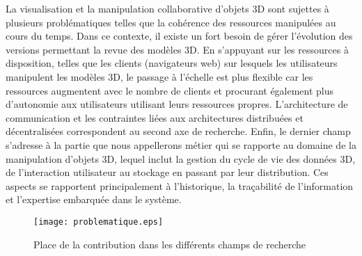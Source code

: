 La visualisation et la manipulation collaborative d'objets \gls{3D} sont sujettes à 
plusieurs problématiques telles que la cohérence des ressources manipulées au 
cours du temps. Dans ce contexte, il existe un fort besoin de gérer l'évolution des 
versions permettant la revue des modèles \gls{3D}. 
En s'appuyant sur les ressources à disposition, telles que les clients (navigateurs 
web) sur lesquels les utilisateurs manipulent les modèles \gls{3D}, le passage à 
l'échelle est plus flexible car les ressources augmentent avec le nombre de clients 
et procurant également plus d'autonomie aux utilisateurs utilisant leurs ressources 
propres.
L'architecture de communication et les contraintes liées aux architectures 
distribuées et décentralisées correspondent au second axe de recherche. 
Enfin, le dernier champ 
s'adresse à la partie que nous appellerons \og métier\fg{} qui se rapporte au 
domaine de la manipulation d'objets \gls{3D}, lequel inclut la 
gestion du cycle de vie des données \gls{3D}, de l'interaction utilisateur au 
stockage 
en passant par leur distribution. Ces aspects se rapportent principalement à 
l'historique, la traçabilité de l'information et l'expertise embarquée dans le système.

\begin{figure}[hbt]
	\centering
	\texttt{[image: problematique.eps]}
	\caption{Place de la contribution dans les différents champs de recherche}
	\label{fig:problematique}
\end{figure}

